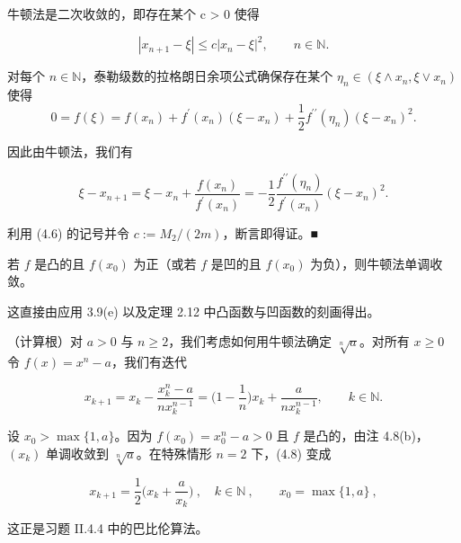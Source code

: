 \begin{remark}

\begin{items}
\item

牛顿法是二次收敛的，即存在某个 c > 0 使得

\[
\left|x_{n+1}-\xi\right|\leq c\left|x_{n}-\xi\right|^{2},\qquad n\in\mathbb{N}.
\]

\proofhead
对每个 $ n \in \mathbb{N} $，泰勒级数的拉格朗日余项公式确保存在某个 $ \eta_n \in (\xi \wedge x_n, \xi \vee x_n) $ 使得
\[
0=f(\xi)=f(x_{n})+f^{\prime}(x_{n})(\xi-x_{n})+\frac{1}{2}f^{\prime\prime}(\eta_{n})(\xi-x_{n})^{2}.
\]

因此由牛顿法，我们有

\[
\xi-x_{n+1}=\xi-x_{n}+\frac{f(x_{n})}{f^{\prime}(x_{n})}=-\frac{1}{2}\frac{f^{\prime\prime}(\eta_{n})}{f^{\prime}(x_{n})}(\xi-x_{n})^{2}.
\]

利用 (4.6) 的记号并令 $ c := M_2/(2m) $，断言即得证。■

\item

若 $f$ 是凸的且 $f(x_{0})$ 为正（或若 $f$ 是凹的且 $f(x_{0})$ 为负），则牛顿法单调收敛。

\proofhead
这直接由应用 3.9(e) 以及定理 2.12 中凸函数与凹函数的刻画得出。
\end{items}

\end{remark}

\begin{example}

（计算根）对 $a > 0$ 与 $n \geq 2$，我们考虑如何用牛顿法确定 $\sqrt[n]{a}$。对所有 $x \geq 0$ 令 $f(x) = x^n - a$，我们有迭代

\begin{equation}
x_{k+1}=x_{k}-\frac{x_{k}^{n}-a}{n x_{k}^{n-1}}=\Big(1-\frac{1}{n}\Big)x_{k}+\frac{a}{n x_{k}^{n-1}},\qquad k\in\mathbb{N}.
\end{equation}

设 $x_0 > \max\{1, a\}$。因为 $f(x_0) = x_0^n - a > 0$ 且 $f$ 是凸的，由注 4.8(b)，$(x_k)$ 单调收敛到 $\sqrt[n]{a}$。在特殊情形 $n = 2$ 下，(4.8) 变成

\[
x_{k+1}=\frac{1}{2}\Big(x_{k}+\frac{a}{x_{k}}\Big)~,\quad k\in\mathbb{N}~,\qquad x_{0}=\operatorname*{m a x}\{1,a\}~,
\]

这正是习题 II.4.4 中的巴比伦算法。

\end{example}

